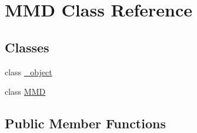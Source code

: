\hypertarget{classMMD}{}\section{M\+MD Class Reference}
\label{classMMD}
\subsection*{Classes}
\begin{DoxyCompactItemize}
\item 
class \hyperlink{classMMD_1_1__object}{\+\_\+object}
\item 
class \hyperlink{classMMD_1_1MMD}{M\+MD}
\end{DoxyCompactItemize}
\subsection*{Public Member Functions}
